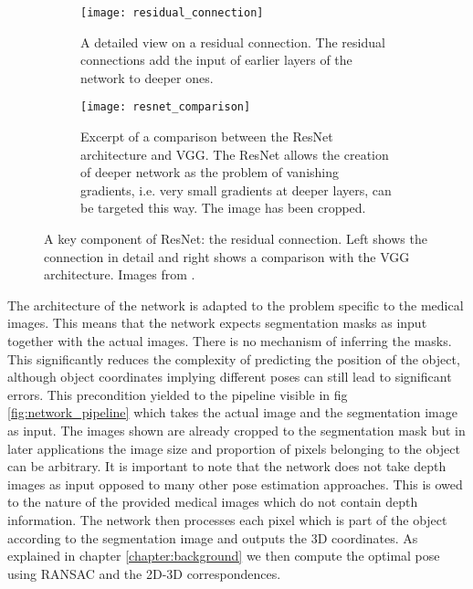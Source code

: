 \begin{figure}[!tbp]
	\centering
	\begin{subfigure}[t]{0.47\textwidth}
		\centering
    	\texttt{[image: residual\_connection]}
    	\caption{A detailed view on a residual connection. The residual connections add the input of earlier layers of the network to deeper ones.}
    	\label{fig:residual_connection}
	\end{subfigure}
	\hfill
	\begin{subfigure}[t]{0.47\textwidth}
		\centering
    	\texttt{[image: resnet\_comparison]}
    	\caption{Excerpt of a comparison between the ResNet architecture and VGG. The ResNet allows the creation of deeper network as the problem of vanishing gradients, i.e. very small gradients at deeper layers, can be targeted this way. The image has been cropped.}
    	\label{fig:resnet_comparison}
	\end{subfigure}
	\caption{A key component of ResNet: the residual connection. Left shows the connection in detail and right shows a comparison with the VGG architecture. Images from \cite{resnet}.}
	\label{fig:resnet_details}
\end{figure} 

The architecture of the network is adapted to the problem specific to the medical images. This means that the network expects segmentation masks as input together with the actual images. There is no mechanism of inferring the masks. This significantly reduces the complexity of predicting the position of the object, although object coordinates implying different poses can still lead to significant errors. This precondition yielded to the pipeline visible in fig \ref{fig:network_pipeline} which takes the actual image and the segmentation image as input. The images shown are already cropped to the segmentation mask but in later applications the image size and proportion of pixels belonging to the object can be arbitrary. It is important to note that the network does not take depth images as input opposed to many other pose estimation approaches. This is owed to the nature of the provided medical images which do not contain depth information. The network then processes each pixel which is part of the object according to the segmentation image and outputs the 3D coordinates. As explained in chapter \ref{chapter:background} we then compute the optimal pose using RANSAC and the 2D-3D correspondences.

